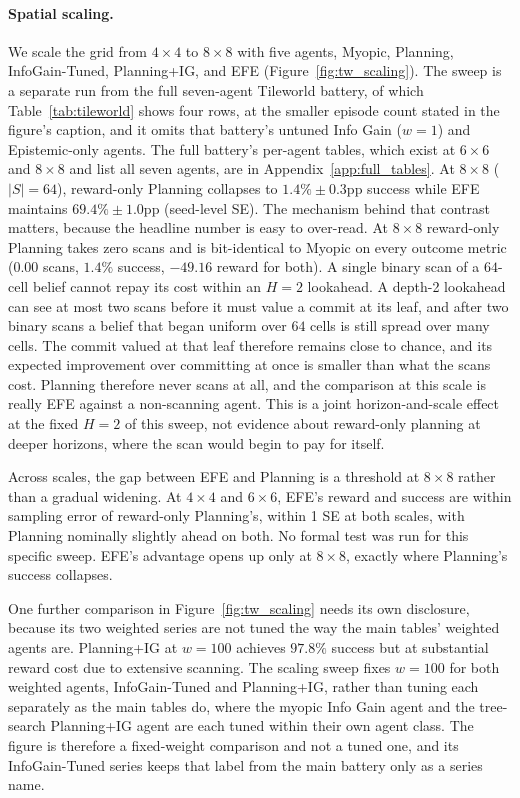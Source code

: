 \paragraph{Spatial scaling.} We scale the grid from $4{\times}4$ to $8{\times}8$ with five agents, Myopic, Planning, InfoGain-Tuned, Planning+IG, and EFE (Figure~\ref{fig:tw_scaling}). The sweep is a separate run from the full seven-agent Tileworld battery, of which Table~\ref{tab:tileworld} shows four rows, at the smaller episode count stated in the figure's caption, and it omits that battery's untuned Info Gain ($w{=}1$) and Epistemic-only agents. The full battery's per-agent tables, which exist at $6{\times}6$ and $8{\times}8$ and list all seven agents, are in Appendix~\ref{app:full_tables}. At $8{\times}8$ ($|S|{=}64$), reward-only Planning collapses to $1.4\% \pm 0.3$pp success while EFE maintains $69.4\% \pm 1.0$pp (seed-level SE). The mechanism behind that contrast matters, because the headline number is easy to over-read. At $8{\times}8$ reward-only Planning takes zero scans and is bit-identical to Myopic on every outcome metric ($0.00$ scans, $1.4\%$ success, $-49.16$ reward for both). A single binary scan of a $64$-cell belief cannot repay its cost within an $H{=}2$ lookahead. A depth-2 lookahead can see at most two scans before it must value a commit at its leaf, and after two binary scans a belief that began uniform over $64$ cells is still spread over many cells. The commit valued at that leaf therefore remains close to chance, and its expected improvement over committing at once is smaller than what the scans cost. Planning therefore never scans at all, and the comparison at this scale is really EFE against a non-scanning agent. This is a joint horizon-and-scale effect at the fixed $H{=}2$ of this sweep, not evidence about reward-only planning at deeper horizons, where the scan would begin to pay for itself.

Across scales, the gap between EFE and Planning is a threshold at $8{\times}8$ rather than a gradual widening. At $4{\times}4$ and $6{\times}6$, EFE's reward and success are within sampling error of reward-only Planning's, within 1 SE at both scales, with Planning nominally slightly ahead on both. No formal test was run for this specific sweep. EFE's advantage opens up only at $8{\times}8$, exactly where Planning's success collapses.

One further comparison in Figure~\ref{fig:tw_scaling} needs its own disclosure, because its two weighted series are not tuned the way the main tables' weighted agents are. Planning+IG at $w{=}100$ achieves $97.8\%$ success but at substantial reward cost due to extensive scanning. The scaling sweep fixes $w{=}100$ for both weighted agents, InfoGain-Tuned and Planning+IG, rather than tuning each separately as the main tables do, where the myopic Info Gain agent and the tree-search Planning+IG agent are each tuned within their own agent class. The figure is therefore a fixed-weight comparison and not a tuned one, and its InfoGain-Tuned series keeps that label from the main battery only as a series name.



